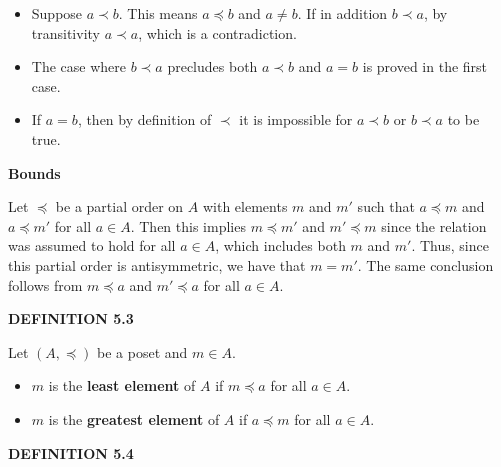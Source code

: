 \documentclass[12pt, a4paper]{article}
\begin{document}
\begin{itemize}
    
    \item Suppose $a\prec b$. This means $a\preceq b$ and $a\neq b$. If in addition $b\prec a$, by transitivity $a\prec a$, which is a contradiction.
    
    \item The case where $b\prec a$ precludes both $a\prec b$ and $a=b$ is proved in the first case.
    
    \item If $a=b$, then by definition of $\prec$ it is impossible for $a\prec b$ or $b\prec a$ to be true. \blacksquare
    
\end{itemize}

\newpage

\noindent\large\textbf{Bounds}\normalsize\par

\vspace{4mm}

\noindent Let $\preceq$ be a partial order on $A$ with elements $m$ and $m'$ such that $a\preceq m$ and $a\preceq m'$ for all $a\in A$. Then this implies $m\preceq m'$ and $m'\preceq m$ since the relation was assumed to hold for all $a\in A$, which includes both $m$ and $m'$. Thus, since this partial order is antisymmetric, we have that $m=m'$. The same conclusion follows from $m\preceq a$ and $m'\preceq a$ for all $a\in A$.\par

\vspace{4mm}

\noindent\blacksquare\textbf{ DEFINITION 5.3}\par

\vspace{4mm}

Let $(A,\preceq)$ be a poset and $m\in A$.\par

\begin{itemize}
    
    \item $m$ is the \textbf{least element} of $A$ if $m\preceq a$ for all $a\in A$.
    
    \item $m$ is the \textbf{greatest element} of $A$ if $a\preceq m$ for all $a\in A$.
    
\end{itemize}

\noindent\blacksquare\textbf{ DEFINITION 5.4}\par
\end{document}
